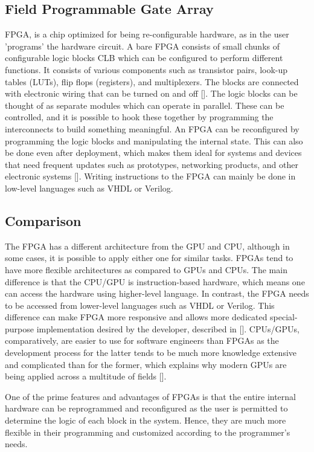 \subsection{Field Programmable Gate Array}
\acrshort{FPGA}, is a chip optimized for being re-configurable hardware, as in the user 'programs' the hardware circuit. 
A bare FPGA consists of small chunks of configurable logic blocks \acrshort{CLB} which can be configured to perform different functions. It consists of various components such as transistor pairs, look-up tables (LUTs), flip flops (registers), and multiplexers.
The blocks are connected with electronic wiring that can be turned on and off [\cite{asic}]. The logic blocks can be thought of as separate modules which can operate in parallel. These can be controlled, and it is possible to hook these together by programming the interconnects to build something meaningful.
An FPGA can be reconfigured by programming the logic blocks and manipulating the internal state. This can also be done even after deployment, which makes them ideal for systems and devices that need frequent updates such as prototypes, networking products, and other electronic systems [\cite{FPGA}]. Writing instructions to the FPGA can mainly be done in low-level languages such as \acrshort{VHDL} or \acrshort{Verilog}. \\


\subsection{Comparison}
The FPGA has a different architecture from the GPU and CPU, although in some cases, it is possible to apply either one for similar tasks. FPGAs tend to have more flexible architectures as compared to GPUs and CPUs. The main difference is that the CPU/GPU is instruction-based hardware, which means one can access the hardware using higher-level language. In contrast, the FPGA needs to be accessed from lower-level languages such as VHDL or Verilog.
This difference can make FPGA more responsive and allows more dedicated special-purpose implementation desired by the developer, described in [\cite{FPGA_CPU}].
CPUs/GPUs, comparatively, are easier to use for software engineers than FPGAs as the development process for the latter tends to be much more knowledge extensive and complicated than for the former, which explains why modern GPUs are being applied across a multitude of fields [\cite{GPUvsfpga}]. 

One of the prime features and advantages of FPGAs is that the entire internal hardware can be reprogrammed and reconfigured as the user is permitted to determine the logic of each block in the system. Hence, they are much more flexible in their programming and customized according to the programmer’s needs. 

